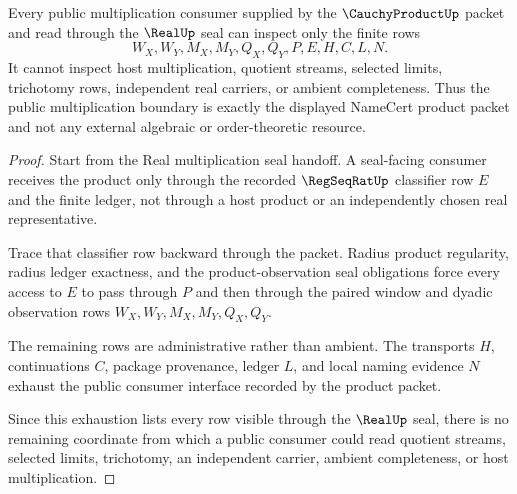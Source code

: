 \begin{theorem}
\label{thm:cauchy-product-multiplication-public-consumer-boundary}
Every public multiplication consumer supplied by the $\CauchyProductUp$ packet and read through the $\RealUp$ seal can inspect only the finite rows
$$
W_X,W_Y,M_X,M_Y,Q_X,Q_Y,P,E,H,C,L,N.
$$
It cannot inspect host multiplication, quotient streams, selected limits, trichotomy rows, independent real carriers, or ambient completeness. Thus the public multiplication boundary is exactly the displayed NameCert product packet and not any external algebraic or order-theoretic resource.
\end{theorem}
\begin{proof}
Start from the Real multiplication seal handoff. A seal-facing consumer receives the product only through the recorded $\RegSeqRatUp$ classifier row $E$ and the finite ledger, not through a host product or an independently chosen real representative.

Trace that classifier row backward through the packet. Radius product regularity, radius ledger exactness, and the product-observation seal obligations force every access to $E$ to pass through $P$ and then through the paired window and dyadic observation rows $W_X,W_Y,M_X,M_Y,Q_X,Q_Y$.

The remaining rows are administrative rather than ambient. The transports $H$, continuations $C$, package provenance, ledger $L$, and local naming evidence $N$ exhaust the public consumer interface recorded by the product packet.

Since this exhaustion lists every row visible through the $\RealUp$ seal, there is no remaining coordinate from which a public consumer could read quotient streams, selected limits, trichotomy, an independent carrier, ambient completeness, or host multiplication.
\end{proof}

